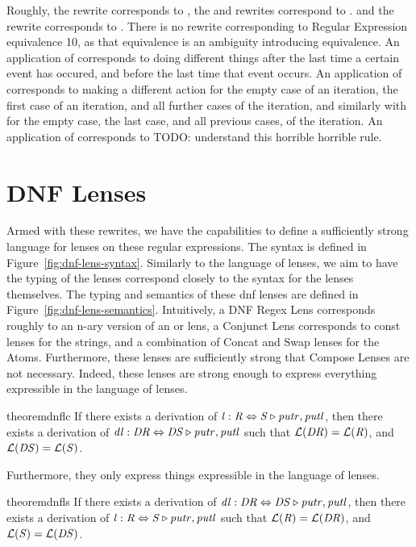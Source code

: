 Roughly, the \AtomSumstarRule{} rewrite corresponds to \SumstarRule{},
the \AtomUnrollstarLeftRule{} and \AtomUnrollstarRightRule{} rewrites correspond to \ProductstarRule{}.
and the \DicyclicRewriteStarRule{} rewrite corresponds to \DicyclicityRule{}.
There is no rewrite corresponding to Regular Expression equivalence 10, as that
equivalence is an ambiguity introducing equivalence.
An application of \AtomSumstarRule{} corresponds to doing different things after the last time a certain event has occured, and before the last time that event occurs.
An application of \AtomUnrollstarLeftRule{} corresponds to making a different action for
the empty case of an iteration, the first case of an iteration, and all further cases of the iteration,
and similarly with \AtomUnrollstarRightRule{} for the empty case, the last case, and all previous cases, of the iteration.
An application of \DicyclicRewriteStarRule{} corresponds to TODO: understand this
horrible horrible rule.

\section{DNF Lenses}


Armed with these rewrites, we have the capabilities to define a sufficiently
strong language for lenses on these regular expressions.
The syntax is defined in Figure~\ref{fig:dnf-lens-syntax}.
Similarly to the language of lenses, we aim to have the typing of the lenses
correspond closely to the syntax for the lenses themselves.
The typing and semantics of these dnf lenses are defined in Figure~\ref{fig:dnf-lens-semantics}.
Intuitively, a DNF Regex Lens corresponds roughly to an n-ary version of an or lens,
a Conjunct Lens corresponds to const lenses for the strings, and a combination of
Concat and Swap lenses for the Atoms.
Furthermore, these lenses are sufficiently strong that Compose Lenses are not
necessary.
Indeed, these lenses are strong enough to express everything expressible in the language of lenses.
\begin{restatable}{theorem}{dnflc}
\label{thm:completeness-dnf-lenses}
If there exists a derivation of $\mathit{l} : \mathit{R} \Leftrightarrow \mathit{S} \triangleright \mathit{putr},\mathit{putl}$,
then there exists a derivation of $\mathit{dl} : \mathit{DR} \Leftrightarrow \mathit{DS} \triangleright \mathit{putr},\mathit{putl}$ such that
$\mathcal{L}(\mathit{DR})=\mathcal{L}(\mathit{R})$, and
$\mathcal{L}(\mathit{DS})=\mathcal{L}(\mathit{S})$.
\end{restatable}
Furthermore, they only express things expressible in the language of lenses.
\begin{restatable}{theorem}{dnfls}
\label{thm:soundness-dnf-lenses}
If there exists a derivation of $\mathit{dl} : \mathit{DR} \Leftrightarrow \mathit{DS} \triangleright \mathit{putr},\mathit{putl}$,
then there exists a derivation of $\mathit{l} : \mathit{R} \Leftrightarrow \mathit{S} \triangleright \mathit{putr},\mathit{putl}$ such that
$\mathcal{L}(\mathit{R})=\mathcal{L}(\mathit{DR})$, and
$\mathcal{L}(\mathit{S})=\mathcal{L}(\mathit{DS})$.
\end{restatable}


